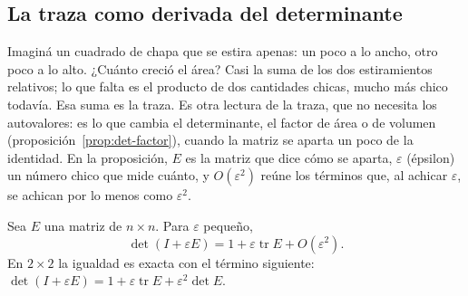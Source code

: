 \subsection{La traza como derivada del determinante}\label{sec:traza-derivada-det}

Imaginá un cuadrado de chapa que se estira apenas: un poco a lo ancho, otro poco a lo alto.
¿Cuánto creció el área? Casi la suma de los dos estiramientos relativos; lo que falta es el
producto de dos cantidades chicas, mucho más chico todavía. Esa suma es la traza.
Es otra lectura de la traza, que no necesita los autovalores: es lo que cambia el
determinante, el factor de área o de volumen (proposición~\ref{prop:det-factor}), cuando la
matriz se aparta un poco de la identidad. En la proposición, \(E\) es la matriz que dice cómo se
aparta, \(\varepsilon\) (épsilon) un número chico que mide cuánto, y \(O(\varepsilon^2)\)
reúne los términos que, al achicar \(\varepsilon\), se achican por lo menos como
\(\varepsilon^2\).

\begin{proposicion}\label{prop:traza-derivada-det}
Sea \(E\) una matriz de \(n\times n\). Para \(\varepsilon\) pequeño,
\[
  \det(I+\varepsilon E)=1+\varepsilon\operatorname{tr}E+O(\varepsilon^2).
\]
En \(2\times2\) la igualdad es exacta con el término siguiente:
\(\det(I+\varepsilon E)=1+\varepsilon\operatorname{tr}E+\varepsilon^2\det E\).
\end{proposicion}

